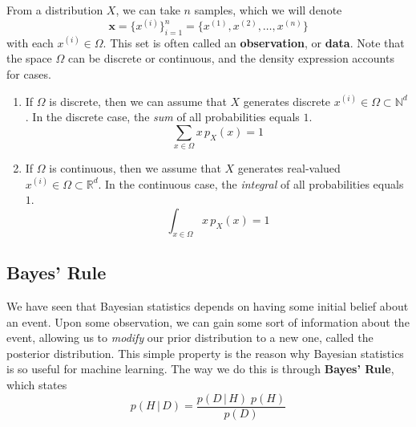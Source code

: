 \documentclass{article}
\begin{document}
    From a distribution $X$, we can take $n$ samples, which we will denote
    \begin{equation}
      \mathbf{x} = \{x^{(i)}\}_{i=1}^n = \{x^{(1)}, x^{(2)}, \ldots, x^{(n)}\}
    \end{equation}
    with each $x^{(i)} \in \Omega$. This set is often called an \textbf{observation}, or \textbf{data}. Note that the space $\Omega$ can be discrete or continuous, and the density expression accounts for cases.

    \begin{enumerate}
      \item If $\Omega$ is discrete, then we can assume that $X$ generates discrete $x^{(i)} \in \Omega \subset \mathbb{N}^d$. In the discrete case, the \textit{sum} of all probabilities equals $1$.
      \begin{equation}
        \sum_{x \in \Omega} x \, p_X (x) = 1
      \end{equation}
      \item If $\Omega$ is continuous, then we assume that $X$ generates real-valued $x^{(i)} \in \Omega \subset \mathbb{R}^d$. In the continuous case, the \textit{integral} of all probabilities equals $1$.
      \begin{equation}
        \int_{x \in \Omega} x \, p_X (x) = 1
      \end{equation}
    \end{enumerate}

  \subsection{Bayes' Rule}

    We have seen that Bayesian statistics depends on having some initial belief about an event. Upon some observation, we can gain some sort of information about the event, allowing us to \textit{modify} our prior distribution to a new one, called the posterior distribution. This simple property is the reason why Bayesian statistics is so useful for machine learning. The way we do this is through \textbf{Bayes' Rule}, which states
    \begin{equation}
      p(H\,|\,D) = \frac{p(D\,|\,H) \; p(H)}{p(D)}
    \end{equation}
\end{document}
